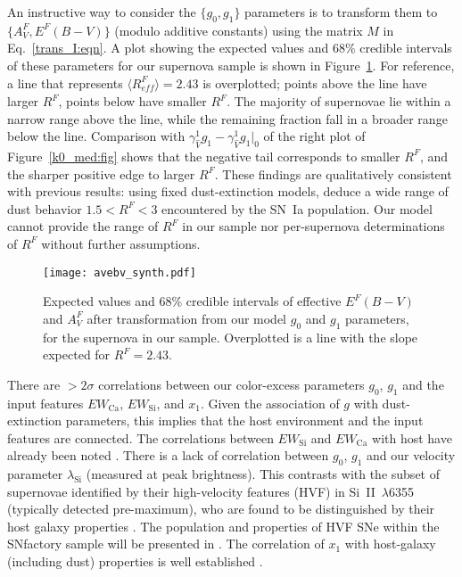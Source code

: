 \documentclass[trackchanges]{aastex62}   	%
\begin{document}
An instructive way to consider the  $\{g_0, g_1\}$ parameters is
to transform them to $\{A_V^F, E^F(B-V)\}$ (modulo additive constants)   using the
matrix $M$ in  Eq.~\ref{trans_I:eqn}.
A plot showing the expected values and 68\% credible intervals of these parameters
for our supernova
sample is shown in Figure~\ref{kk:fig}. 
For reference, a line that represents $\langle R^F_{\mathit{eff}}\rangle=2.43$ is overplotted; points above
the line have larger $R^F$, points below have smaller $R^F$.  The majority of supernovae lie within a narrow range above the line,
while the remaining fraction fall in a broader range below the line.
Comparison with  $\gamma^1_{\hat{V}} g_1-\gamma^1_{\hat{V}} g_1|_0$ of the right plot of Figure~\ref{k0_med:fig}
shows that the 
negative tail corresponds to smaller $R^F$, and the sharper positive edge to larger $R^F$.
These findings are qualitatively consistent with previous results:
using fixed dust-extinction models,
\citet{2014ApJ...789...32B, 2015MNRAS.453.3300A} deduce a wide range of dust behavior $1.5<R^F<3$ encountered by the SN~Ia population.
Our model cannot provide the range of $R^F$ in our sample nor per-supernova determinations of $R^F$ 
without further assumptions.

\begin{figure}[htbp] %
   \centering
   \texttt{[image: avebv\_synth.pdf]}
      \caption{
      Expected values and 68\% credible intervals of effective $E^F(B-V)$ and $A_V^F$ after transformation from our model $g_0$ and $g_1$ parameters, for the supernova in our sample.
      Overplotted is a line with the slope expected for $R^F=2.43$.
   \label{kk:fig}}
\end{figure}



There are $>2 \sigma$ correlations between our  color-excess parameters $g_0$, $g_1$
and the input features  $EW_{\mathrm{Ca}}$,
$EW_{\mathrm{Si}}$, and $x_1$. 
Given the association
of  $g$ with dust-extinction parameters, this implies that the host environment and the input features are connected.
The correlations between $EW_{\mathrm{Si}}$ and  $EW_{\mathrm{Ca}}$  with host have already been noted \citep{2011ApJ...734...42N, 2015MNRAS.451.1973S}.
There is a lack of correlation between  $g_0$, $g_1$ and  our velocity parameter $\lambda_{\mathrm{Si}}$
(measured at peak brightness).
This contrasts with the subset of supernovae identified by their high-velocity features (HVF) in
Si~II~$\lambda$6355
(typically detected pre-maximum), who are found to be distinguished by their host galaxy properties
\citep[e.g.][]{2014MNRAS.444.3258M, 2015MNRAS.446..354P, 2015ApJS..220...20Z}.
The population and properties of HVF SNe within the SNfactory sample will be presented in \citet{2018lin}.
The correlation of $x_1$ with  host-galaxy (including dust) properties is  well established 
\citep{2000AJ....120.1479H, 2003MNRAS.340.1057S}.
\end{document}
